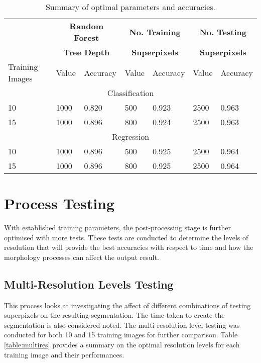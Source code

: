 \begin{table}[H]
\centering
\caption{Summary of optimal parameters and accuracies. }

\begin{tabular}{|l|l|l|l|l|l|l|}
\hline
	& \multicolumn{2}{|c|}{\textbf{Random Forest}} & \multicolumn{2}{|c|}{\textbf{No. Training}} & \multicolumn{2}{|c|}{\textbf{No. Testing}}	\\
	&\multicolumn{2}{|c|}{\textbf{Tree Depth}}& 	\multicolumn{2}{|c|}{\textbf{Superpixels}} & \multicolumn{2}{|c|}{\textbf{Superpixels}}\\
\hline
Training Images  & Value & Accuracy &  Value & Accuracy & Value & Accuracy\\	
\hline 
\hline
\multicolumn{7}{|c|}{Classification}\\
\hline
10 & 1000 & 0.820 & 500 & 0.923 & 2500 & 0.963 \\
15 & 1000 & 0.896 & 800 & 0.924 & 2500 & 0.963 \\
\hline
\hline
\multicolumn{7}{|c|}{Regression}\\
\hline
10 & 1000 & 0.896 & 500 & 0.925 & 2500 & 0.964\\
15 & 1000 & 0.896 & 800 & 0.925 & 2500 & 0.964\\
\hline
		   		
\end{tabular}
\label{table:paramres}
\end{table}

\section{Process Testing}
With established training parameters, the post-processing stage is further optimised with more tests. These tests are conducted to determine the levels of resolution that will provide the best accuracies with respect to time and how the morphology processes can affect the output result.

\subsection{Multi-Resolution Levels Testing}
This process looks at investigating the affect of different combinations of testing superpixels on the resulting segmentation. The time taken to create the segmentation is also considered noted. The multi-resolution level testing was conducted for both 10 and 15 training images for further comparison. Table \ref{table:multires} provides a summary on the optimal resolution levels for each training image and their performances.

